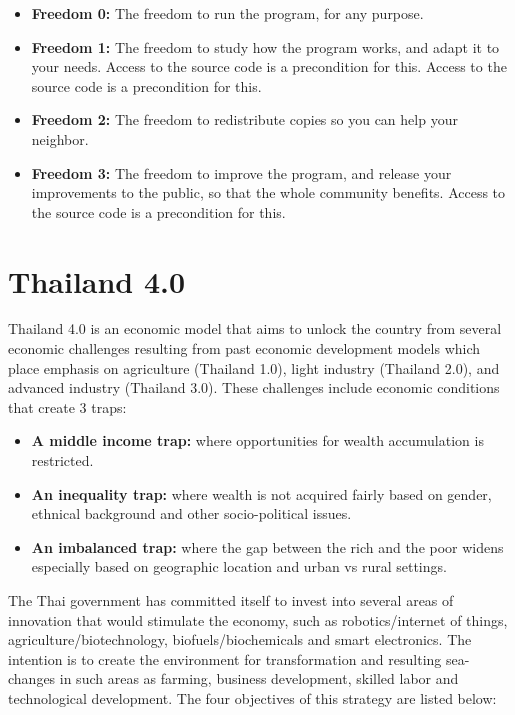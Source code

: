\documentclass[]{book}
\providecommand{\tightlist}{%
  \setlength{\itemsep}{0pt}\setlength{\parskip}{0pt}}
\begin{document}
\begin{itemize}
\tightlist
\item
  \textbf{Freedom 0:} The freedom to run the program, for any purpose.
\item
  \textbf{Freedom 1:} The freedom to study how the program works, and adapt it to your needs. Access to the source code is a precondition for this. Access to the source code is a precondition for this.
\item
  \textbf{Freedom 2:} The freedom to redistribute copies so you can help your neighbor.
\item
  \textbf{Freedom 3:} The freedom to improve the program, and release your improvements to the public, so that the whole community benefits. Access to the source code is a precondition for this. \citep{FSF2018}
\end{itemize}

\hypertarget{thailand-4.0}{%
\section{Thailand 4.0}\label{thailand-4.0}}

Thailand 4.0 is an economic model that aims to unlock the country from several economic challenges resulting from past economic development models which place emphasis on agriculture (Thailand 1.0), light industry (Thailand 2.0), and advanced industry (Thailand 3.0). These challenges include economic conditions that create 3 traps:

\begin{itemize}
\tightlist
\item
  \textbf{A middle income trap:} where opportunities for wealth accumulation is restricted.
\item
  \textbf{An inequality trap:} where wealth is not acquired fairly based on gender, ethnical background and other socio-political issues.
\item
  \textbf{An imbalanced trap:} where the gap between the rich and the poor widens especially based on geographic location and urban vs rural settings.
\end{itemize}

The Thai government has committed itself to invest into several areas of innovation that would stimulate the economy, such as robotics/internet of things, agriculture/biotechnology, biofuels/biochemicals and smart electronics. \citep{TMC2016} The intention is to create the environment for transformation and resulting sea-changes in such areas as farming, business development, skilled labor and technological development. \citep{RTE2016} The four objectives of this strategy are listed below:
\end{document}
